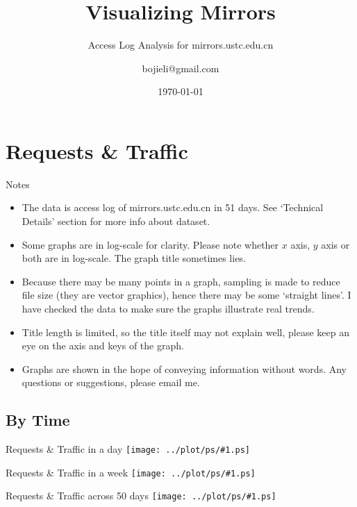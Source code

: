 \documentclass{beamer}
\newcommand\graph[1]{{\texttt{[image: ../plot/ps/\#1.ps]}}}
\begin{document}
\title{Visualizing Mirrors}
\subtitle{Access Log Analysis for mirrors.ustc.edu.cn}
\author{bojieli@gmail.com}
\date{\today}
\frame{\titlepage}


\section{Requests \& Traffic}

\begin{frame}{Notes}
\begin{itemize}
  \item The data is access log of mirrors.ustc.edu.cn in 51 days. See `Technical Details' section for more info about dataset.
  \item Some graphs are in log-scale for clarity. Please note whether $x$ axis, $y$ axis or both are in log-scale. The graph title sometimes lies.
  \item Because there may be many points in a graph, sampling is made to reduce file size (they are vector graphics), hence there may be some `straight lines'. I have checked the data to make sure the graphs illustrate real trends.
  \item Title length is limited, so the title itself may not explain well, please keep an eye on the axis and keys of the graph.
  \item Graphs are shown in the hope of conveying information without words. Any questions or suggestions, please email me.
\end{itemize}
\end{frame}

\subsection{By Time}

\begin{frame}{Requests \& Traffic in a day}
\graph{req-daymin}
\end{frame}

\begin{frame}{Requests \& Traffic in a week}
\graph{req-weekday}
\end{frame}

\begin{frame}{Requests \& Traffic across 50 days}
\graph{req-days}
\end{frame}
\end{document}
